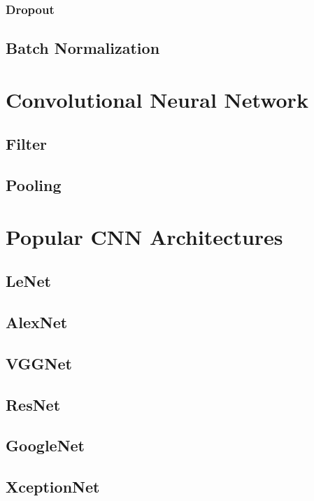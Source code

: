 \documentclass[10pt]{article}
\begin{document}
\subsubsection{Dropout}

\subsection{Batch Normalization}

\section{Convolutional Neural Network}

\subsection{Filter}

\subsection{Pooling}

\section{Popular CNN Architectures}

\subsection{LeNet}

\subsection{AlexNet}

\subsection{VGGNet}

\subsection{ResNet}

\subsection{GoogleNet}

\subsection{XceptionNet}
\end{document}
